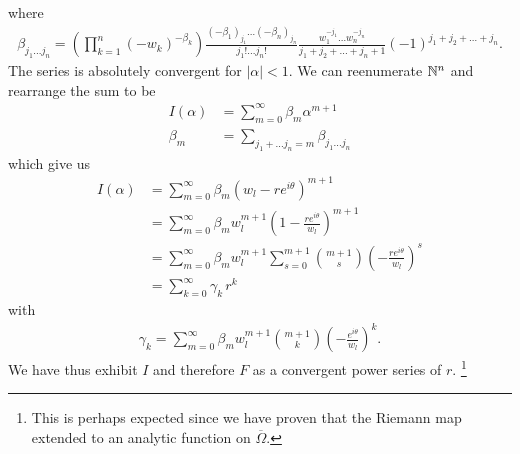 where 
\begin{align*}
\beta_{j_1 \dots j_n} = \left(\prod_{k = 1}^n (-w_k)^{-\beta_k} \right) \frac{(-\beta_1)_{j_1} \dots (-\beta_n)_{j_n}}{j_1! \dots j_n!} \frac{w_1^{-j_1}  \dots w_n^{-j_n}}{j_1 + j_2 + \dots + j_n + 1} (-1)^{j_1 + j_2 + \dots + j_n}. 
\end{align*}
The series is absolutely convergent for $|\alpha| < 1$. We can reenumerate $\mathbb N^n$ and rearrange the sum to be
\begin{align*}
I(\alpha) &= \sum_{m = 0}^\infty \beta_m \alpha^{m + 1} \\
\beta_m &= \sum_{j_1 + \dots j_n = m} \beta_{j_1 \dots j_n}
\end{align*}
which give us
\begin{align*}
I(\alpha) 
&= \sum_{m = 0}^\infty \beta_m \left(w_l - re^{i \theta} \right)^{m + 1} \\
&= \sum_{m = 0}^\infty \beta_m w_l^{m + 1} \left(1 - \frac{re^{i \theta}}{w_l} \right)^{m + 1} \\
&= \sum_{m = 0}^\infty \beta_m w_l^{m + 1} \sum_{s = 0}^{m + 1} {m + 1 \choose s} \left(-\frac{re^{i \theta}}{w_l} \right)^{s} \\
&= \sum_{k = 0}^{\infty} \gamma_k\, r^k
\end{align*}
with 
\begin{align*}
\gamma_k = \sum_{m = 0}^\infty \beta_m w_l^{m + 1} {m + 1 \choose k} \left(-\frac{e^{i \theta}}{w_l} \right)^{k}. 
\end{align*}
We have thus exhibit $I$ and therefore $F$ as a convergent power series of $r$. \footnote{This is perhaps expected since we have proven that the Riemann map extended to an analytic function on $\overline{\Omega}$. }
















